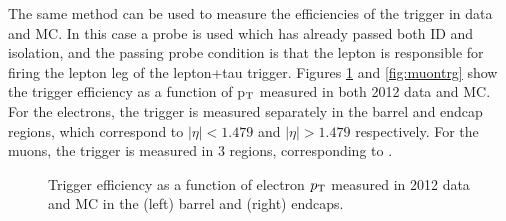 \noindent The same method can be used to measure the efficiencies of the trigger
in data and MC. In this case a probe is used which has already passed both ID
and isolation, and the passing probe condition is that the lepton is responsible
for firing the lepton leg of the lepton+tau trigger. Figures
\ref{fig:electrontrg} and \ref{fig:muontrg} show the trigger efficiency as a
function of p$_{\rm{T}}$ measured in both 2012 data and MC. For the
electrons, the trigger is measured separately in the barrel and endcap
regions, which correspond to $|\eta| < 1.479$ and $|\eta| > 1.479$
respectively. For the muons, the trigger is measured in 3 regions, corresponding
to .

\begin{figure}[h!]
\caption{Trigger efficiency as a function of electron $p_{\mathrm{T}}$ measured
in 2012 data and MC in the (left) barrel and (right) endcaps.}
\label{fig:electrontrg}
\end{figure}

